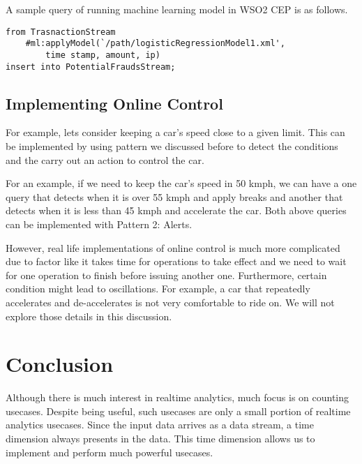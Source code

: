 \documentclass{sig-alternate}
\begin{document}
{A sample query of running machine learning model in WSO2 CEP is as follows.


\begin{lstlisting}[mathescape, showstringspaces=false]
from TrasnactionStream
	#ml:applyModel(`/path/logisticRegressionModel1.xml',  
		time stamp, amount, ip) 
insert into PotentialFraudsStream;
\end{lstlisting} 

\subsection{Implementing Online Control} 

For example, lets consider keeping a car's speed close to a given limit. This can be implemented by using pattern we discussed before to detect the conditions and the carry out an action to control the car. 

For an example, if we need to keep the car's speed in 50 kmph, we can have a one query that detects when it is over 55 kmph and apply breaks and another that detects when it is less than 45 kmph and accelerate the car. Both above queries can be implemented with Pattern 2: Alerts. 

However, real life implementations of online control is much more complicated due to factor like it takes time for operations to take effect and we need to wait for one operation to finish before issuing another one. Furthermore, certain condition might lead to oscillations. For example, a car that repeatedly accelerates and de-accelerates is not very comfortable to ride on. We will not explore those details in this discussion. 

\section{Conclusion} 

Although there is much interest in realtime analytics, much focus is on counting usecases. Despite being useful, such usecases are only a small portion of realtime analytics usecases. Since the input data arrives as a data stream, a time dimension always presents in the data. This time dimension allows us to implement and perform much powerful usecases.  

}
\end{document}
